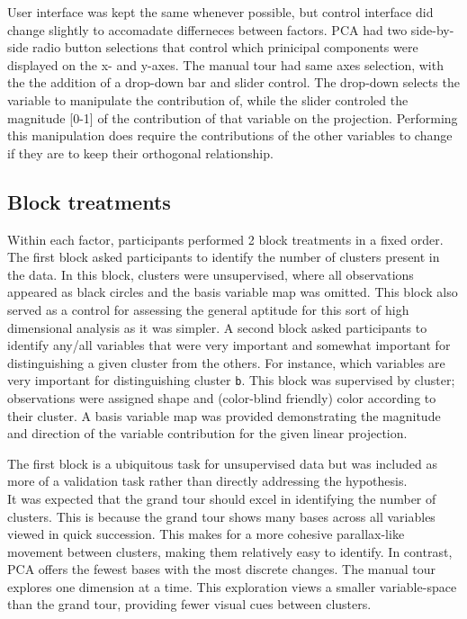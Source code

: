 \documentclass[]{article}
\begin{document}
User interface was kept the same whenever possible, but control
interface did change slightly to accomadate differneces between factors.
PCA had two side-by-side radio button selections that control which
prinicipal components were displayed on the x- and y-axes. The manual
tour had same axes selection, with the the addition of a drop-down bar
and slider control. The drop-down selects the variable to manipulate the
contribution of, while the slider controled the magnitude {[}0-1{]} of
the contribution of that variable on the projection. Performing this
manipulation does require the contributions of the other variables to
change if they are to keep their orthogonal relationship.

\hypertarget{sec:blocks}{%
\subsection{Block treatments}\label{sec:blocks}}

Within each factor, participants performed 2 block treatments in a fixed
order. The first block asked participants to identify the number of
clusters present in the data. In this block, clusters were unsupervised,
where all observations appeared as black circles and the basis variable
map was omitted. This block also served as a control for assessing the
general aptitude for this sort of high dimensional analysis as it was
simpler. A second block asked participants to identify any/all variables
that were very important and somewhat important for distinguishing a
given cluster from the others. For instance, which variables are very
important for distinguishing cluster \texttt{b}. This block was
supervised by cluster; observations were assigned shape and (color-blind
friendly) color according to their cluster. A basis variable map was
provided demonstrating the magnitude and direction of the variable
contribution for the given linear projection.

The first block is a ubiquitous task for unsupervised data but was
included as more of a validation task rather than directly addressing
the hypothesis.\\
It was expected that the grand tour should excel in identifying the
number of clusters. This is because the grand tour shows many bases
across all variables viewed in quick succession. This makes for a more
cohesive parallax-like movement between clusters, making them relatively
easy to identify. In contrast, PCA offers the fewest bases with the most
discrete changes. The manual tour explores one dimension at a time. This
exploration views a smaller variable-space than the grand tour,
providing fewer visual cues between clusters.
\end{document}
